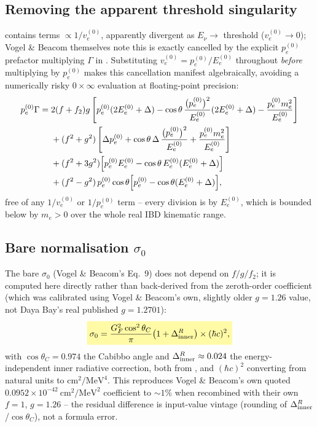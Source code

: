 \begin{theorybox}
\subsection*{Removing the apparent threshold singularity}
 contains terms $\propto 1/v_e^{(0)}$, apparently
divergent as $E_\nu\to$ threshold ($v_e^{(0)}\to0$); Vogel \& Beacom
themselves note this is exactly cancelled by the explicit $p_e^{(0)}$
prefactor multiplying $\Gamma$ in .
Substituting $v_e^{(0)}=p_e^{(0)}/E_e^{(0)}$ throughout \emph{before}
multiplying by $p_e^{(0)}$ makes this cancellation manifest algebraically,
avoiding a numerically risky $0\times\infty$ evaluation at floating-point
precision:
\begin{align}
  p_e^{(0)}\Gamma ={}& 2(f+f_2)g\left[p_e^{(0)}(2E_e^{(0)}+\Delta) -
    \cos\theta\,\frac{\bigl(p_e^{(0)}\bigr)^2}{E_e^{(0)}}(2E_e^{(0)}+\Delta)
    - \frac{p_e^{(0)}m_e^2}{E_e^{(0)}}\right] \nonumber \\
  & + (f^2+g^2)\left[\Delta p_e^{(0)} + \cos\theta\,\Delta\,\frac{\bigl(p_e^{(0)}\bigr)^2}{E_e^{(0)}}
    + \frac{p_e^{(0)}m_e^2}{E_e^{(0)}}\right] \nonumber \\
  & + (f^2+3g^2)\Bigl[p_e^{(0)}E_e^{(0)}-\cos\theta\,E_e^{(0)}(E_e^{(0)}+\Delta)\Bigr] \nonumber \\
  & + (f^2-g^2)\,p_e^{(0)}\cos\theta\Bigl[p_e^{(0)}-\cos\theta(E_e^{(0)}+\Delta)\Bigr],
  \label{eq:ibd-gamma-clean}
\end{align}
free of any $1/v_e^{(0)}$ or $1/p_e^{(0)}$ term -- every division is by
$E_e^{(0)}$, which is bounded below by $m_e>0$ over the whole real IBD
kinematic range.

\subsection*{Bare normalisation $\sigma_0$}
The bare $\sigma_0$ (Vogel \& Beacom's Eq.~9) does not depend on
$f/g/f_2$; it is computed here directly rather than back-derived from the
zeroth-order coefficient (which was calibrated using Vogel \& Beacom's own,
slightly older $g=1.26$ value, not Daya Bay's real published
$g=1.2701$):
\begin{equation}
  \keyresult{\sigma_0 = \frac{G_F^2\cos^2\theta_C}{\pi}\bigl(1+\Delta_{\rm inner}^R\bigr)
    \times (\hbar c)^2,}
  \label{eq:ibd-sigma0-firstprinciples}
\end{equation}
with $\cos\theta_C=0.974$ the Cabibbo angle and $\Delta_{\rm inner}^R\approx
0.024$ the energy-independent inner radiative correction, both from
\cite{VogelBeacom1999}, and $(\hbar c)^2$ converting from natural units to
$\mathrm{cm^2/MeV^4}$. This reproduces Vogel \& Beacom's own quoted
$0.0952\times10^{-42}\ \mathrm{cm^2/MeV^2}$ coefficient to $\sim1\%$ when
recombined with their own $f=1$, $g=1.26$ -- the residual difference is
input-value vintage (rounding of $\Delta_{\rm inner}^R$/$\cos\theta_C$),
not a formula error.


\end{theorybox}

